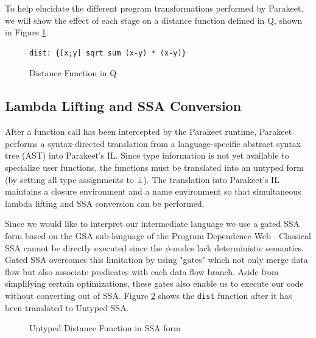 \documentclass[preprint]{sigplanconf}
\begin{document}
To help elucidate the different program transformations performed by Parakeet, we will show the effect of each stage on a distance function defined in Q, shown in Figure \ref{QDist}.

\begin{figure}[h!]
    \begin{lstlisting}[numbers=none]
    dist: {[x;y] sqrt sum (x-y) * (x-y)}
    \end{lstlisting}
    \caption{Distance Function in Q}
    \label{QDist}
\end{figure}

\subsection{Lambda Lifting and SSA Conversion}
After a function call has been intercepted by the Parakeet runtime, Parakeet performs a syntax-directed translation from a language-specific abstract syntax tree (AST) into Parakeet's IL. Since type information is not yet available to specialize user functions, the functions must be translated into an untyped
form (by setting all type assignments to $\bot$). The translation into Parakeet's IL maintains a closure environment and a name environment so that simultaneous lambda lifting and SSA conversion can be performed.

Since we would like to interpret our intermediate language we use a gated SSA form based on the GSA sub-language of the Program Dependence Web \cite{Ott90}. Classical SSA cannot be directly executed since the $\phi$-nodes lack deterministic semantics. Gated SSA overcomes this limitation by using "gates" which not only merge data flow but also associate predicates with each data flow branch. Aside from simplifying certain optimizations, these gates also enable us to execute our code without converting out of SSA.  Figure \ref{UntypedSSADist} shows the \texttt{dist} function after it has been translated to Untyped SSA.

\begin{figure}[h!]
\caption{Untyped Distance Function in SSA form}
\label{UntypedSSADist}
\end{figure}
\end{document}
